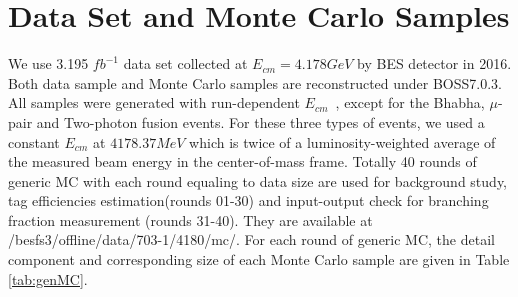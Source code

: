\section{Data Set and Monte Carlo Samples}
We use 3.195 $fb^{-1}$ data set collected at $E_{cm} = 4.178 GeV$ by BES\uppercase\expandafter{} detector in 2016. Both data sample and Monte Carlo samples are reconstructed under BOSS7.0.3. 
All samples were generated with run-dependent $E_{cm}$~\cite{DocDB 580-v1}, except for the Bhabha, $\mu$-pair and Two-photon fusion events.
For these three types of events, we used a constant $E_{cm}$ at $4178.37MeV$ which is twice of a luminosity-weighted average of the measured beam energy in the center-of-mass frame. 
Totally 40 rounds of generic MC with each round equaling to data size are used for background study, tag efficiencies estimation(rounds 01-30) and input-output check for branching fraction measurement (rounds 31-40). 
They are available at
/besfs3/offline/data/703-1/4180/mc/.
For each round of generic MC, the detail component and corresponding size of each Monte Carlo sample are given in Table \ref{tab:genMC}.
